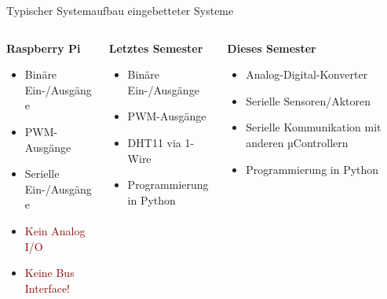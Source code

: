 {\begin{frame}{Typischer Systemaufbau eingebetteter Systeme}
    \begin{columns}
        \begin{column}[T]{.3\textwidth}
            \textbf{Raspberry Pi}
            \begin{itemize}
                \item Binäre Ein-/Ausgänge
                \item PWM-Ausgänge
                \item Serielle Ein-/Ausgänge
                \item<2> \textcolor{darkred}{Kein Analog I/O}
                \item<2> \textcolor{darkred}{Keine Bus Interface!}
            \end{itemize}
        \end{column}
        \begin{column}[T]{.3\textwidth}
            \textbf{Letztes Semester}
            \begin{itemize}
                \item Binäre Ein-/Ausgänge
                \item PWM-Ausgänge
                \item DHT11 via 1-Wire
                \item Programmierung in Python
            \end{itemize}
        \end{column}
        \begin{column}[T]{.3\textwidth}
            \textbf{Dieses Semester}
            \begin{itemize}
                \item Analog-Digital-Konverter
                \item Serielle Sensoren/Aktoren
                \item Serielle Kommunikation mit anderen µControllern
                \item Programmierung in Python
            \end{itemize}
        \end{column}
    \end{columns}
\end{frame}
}

